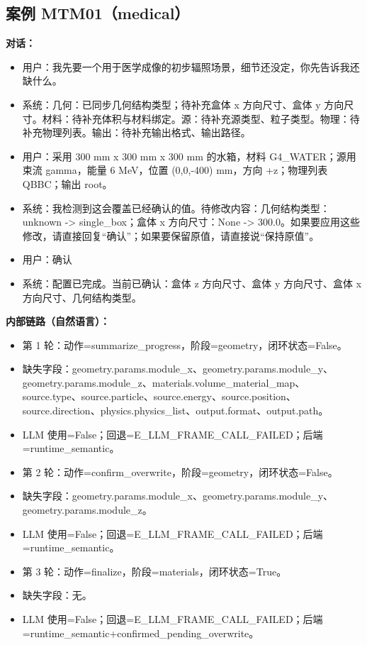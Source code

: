 \documentclass[11pt]{ctexart}
\begin{document}
\subsection{案例 MTM01（medical）}
\textbf{对话：}
\begin{itemize}
\item 用户：我先要一个用于医学成像的初步辐照场景，细节还没定，你先告诉我还缺什么。
\item 系统：几何：已同步几何结构类型；待补充盒体 x 方向尺寸、盒体 y 方向尺寸。材料：待补充体积与材料绑定。源：待补充源类型、粒子类型。物理：待补充物理列表。输出：待补充输出格式、输出路径。
\item 用户：采用 300 mm x 300 mm x 300 mm 的水箱，材料 G4\_WATER；源用束流 gamma，能量 6 MeV，位置 (0,0,-400) mm，方向 +z；物理列表 QBBC；输出 root。
\item 系统：我检测到这会覆盖已经确认的值。待修改内容：几何结构类型：unknown -> single\_box；盒体 x 方向尺寸：None -> 300.0。如果要应用这些修改，请直接回复“确认”；如果要保留原值，请直接说“保持原值”。
\item 用户：确认
\item 系统：配置已完成。当前已确认：盒体 z 方向尺寸、盒体 y 方向尺寸、盒体 x 方向尺寸、几何结构类型。
\end{itemize}
\textbf{内部链路（自然语言）：}
\begin{itemize}
\item 第 1 轮：动作=summarize\_progress，阶段=geometry，闭环状态=False。
\item 缺失字段：geometry.params.module\_x、geometry.params.module\_y、geometry.params.module\_z、materials.volume\_material\_map、source.type、source.particle、source.energy、source.position、source.direction、physics.physics\_list、output.format、output.path。
\item LLM 使用=False；回退=E\_LLM\_FRAME\_CALL\_FAILED；后端=runtime\_semantic。
\item 第 2 轮：动作=confirm\_overwrite，阶段=geometry，闭环状态=False。
\item 缺失字段：geometry.params.module\_x、geometry.params.module\_y、geometry.params.module\_z。
\item LLM 使用=False；回退=E\_LLM\_FRAME\_CALL\_FAILED；后端=runtime\_semantic。
\item 第 3 轮：动作=finalize，阶段=materials，闭环状态=True。
\item 缺失字段：无。
\item LLM 使用=False；回退=E\_LLM\_FRAME\_CALL\_FAILED；后端=runtime\_semantic+confirmed\_pending\_overwrite。
\end{itemize}
\end{document}

